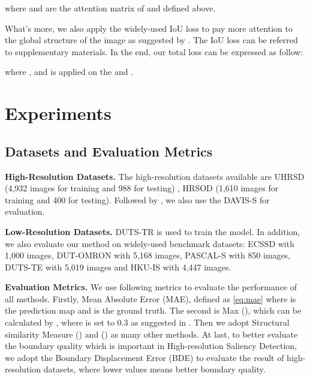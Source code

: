 \documentclass[10pt,twocolumn,letterpaper]{article}
\begin{document}
where  and  are the attention matrix of  and  defined above.

What's more, we also apply the widely-used IoU loss \cite{mattyus2017deeproadmapper} to pay more attention to the global structure of the image as suggested by \cite{qin2019basnet}. The IoU loss  can be referred to supplementary materials.
In the end, our total loss can be expressed as follow:

where , and  is  applied on the  and .

\label{subsec:agl}
\section{Experiments}

\subsection{Datasets and Evaluation Metrics}

\textbf{High-Resolution Datasets.} 
The high-resolution datasets available are UHRSD (4,932 images for training and 988 for testing) , HRSOD\cite{zeng2019towards} (1,610 images for training and 400 for testing). Followed by \cite{zeng2019towards,tang2021disentangled}, we also use the DAVIS-S for evaluation. 

\textbf{Low-Resolution Datasets.} 
DUTS-TR \cite{wang2017learning} is used to train the model. In addition, we also evaluate our method on widely-used benchmark datasets: ECSSD \cite{yan2013hierarchical} with 1,000 images, DUT-OMRON \cite{yang2013saliency} with 5,168 images, PASCAL-S\cite{li2014secrets} with 850 images, DUTS-TE \cite{wang2017learning} with 5,019 images and HKU-IS\cite{li2015visual} with 4,447 images.

\textbf{Evaluation Metrics.}
We use following metrics to evaluate the performance of all methods. Firstly, Mean Absolute Error (MAE), defined as \cref{eq:mae} where  is the prediction map and  is the ground truth.  
The second is Max  (), which can be calculated by
, where  is set to 0.3 as suggested in \cite{borji2015salient}. 
Then we adopt Structural similarity Measure () \cite{fan2017structure} and () \cite{fan2018enhanced} as many other methods\cite{wei2020f3net,ma2021pyramidal}. 
At last, to better evaluate the boundary quality which is important in High-resolution Saliency Detection\cite{zeng2019towards,tang2021disentangled}, we adopt the Boundary Displacement Error (BDE) to evaluate the result of high-resolution datasets, where lower values means better boundary quality.
\end{document}
